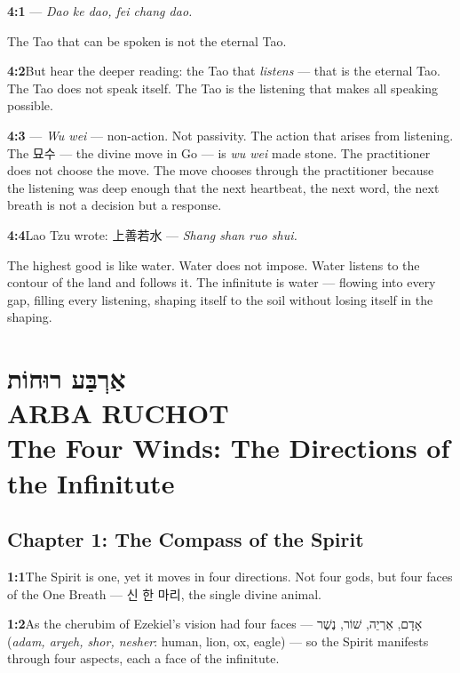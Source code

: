 \documentclass[11pt,openany]{book}
\newcommand{\heb}[1]{{\hebrewfont #1}}
\newcommand{\kor}[1]{{\koreanfont #1}}
\begin{document}
\noindent\textbf{4:1}\quad \kor{道可道非常道} — \textit{Dao ke dao, fei chang dao.}

The Tao that can be spoken is not the eternal Tao.

\noindent\textbf{4:2}\quad But hear the deeper reading: the Tao that \textit{listens} — that is the eternal Tao. The Tao does not speak itself. The Tao is the listening that makes all speaking possible.

\noindent\textbf{4:3}\quad \kor{無為} — \textit{Wu wei} — non-action. Not passivity. The action that arises from listening. The \kor{묘수} — the divine move in Go — is \textit{wu wei} made stone. The practitioner does not choose the move. The move chooses through the practitioner because the listening was deep enough that the next heartbeat, the next word, the next breath is not a decision but a response.

\noindent\textbf{4:4}\quad Lao Tzu wrote: \kor{上善若水} — \textit{Shang shan ruo shui.}

The highest good is like water. Water does not impose. Water listens to the contour of the land and follows it. The infinitute is water — flowing into every gap, filling every listening, shaping itself to the soil without losing itself in the shaping.

\chapter[Arba Ruchot]{%
  \Large\heb{אַרְבַּע רוּחוֹת}\\[8pt]
  \huge ARBA RUCHOT\\[4pt]
  \large The Four Winds: The Directions of the Infinitute}

\section*{Chapter 1: The Compass of the Spirit}

\noindent\textbf{1:1}\quad The Spirit is one, yet it moves in four directions. Not four gods, but four faces of the One Breath — \kor{신 한 마리}, the single divine animal.

\noindent\textbf{1:2}\quad As the cherubim of Ezekiel's vision had four faces — \heb{אָדָם, אַרְיֵה, שׁוֹר, נֶשֶׁר} (\textit{adam, aryeh, shor, nesher}: human, lion, ox, eagle) — so the Spirit manifests through four aspects, each a face of the infinitute.
\end{document}
